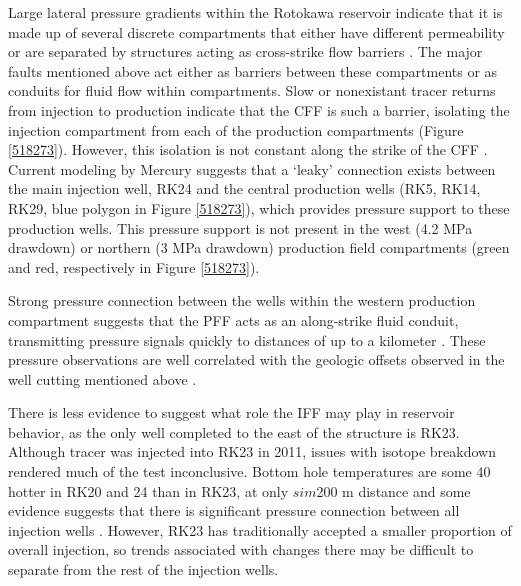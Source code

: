 Large lateral pressure gradients within the Rotokawa reservoir indicate that it is made up of several discrete compartments that either have different permeability or are separated by structures acting as cross-strike flow barriers \citep{Quinao_2013stanford,Sewell_2015}. The major faults mentioned above act either as barriers between these compartments or as conduits for fluid flow within compartments. Slow or nonexistant tracer returns from injection to production indicate that the CFF is such a barrier, isolating the injection compartment from each of the production compartments (Figure \ref{518273}). However, this isolation is not constant along the strike of the CFF \citep{Addison_2017stanford}. Current modeling by Mercury suggests that a `leaky' connection exists between the main injection well, RK24 and the central production wells (RK5, RK14, RK29, blue polygon in Figure \ref{518273}), which provides pressure support to these production wells. This pressure support is not present in the west (4.2 MPa drawdown) or northern (3 MPa drawdown) production field compartments \citep{Quinao_2013stanford,Addison_2017stanford} (green and red, respectively in Figure \ref{518273}).

Strong pressure connection between the wells within the western production compartment suggests that the PFF acts as an along-strike fluid conduit, transmitting pressure signals quickly to distances of up to a kilometer \citep{Quinao_2013stanford,Sewell_2015,McNamara_2016}. These pressure observations are well correlated with the geologic offsets observed in the well cutting mentioned above \citep{wallis2013}.

There is less evidence to suggest what role the IFF may play in reservoir behavior, as the only well completed to the east of the structure is RK23. Although tracer was injected into RK23 in 2011, issues with isotope breakdown rendered much of the test inconclusive. Bottom hole temperatures are some 40 hotter in RK20 and 24 than in RK23, at only $sim$200 m distance and some evidence suggests that there is significant pressure connection between all injection wells \citep{Quinao_2013stanford}. However, RK23 has traditionally accepted a smaller proportion of overall injection, so trends associated with changes there may be difficult to separate from the rest of the injection wells.

